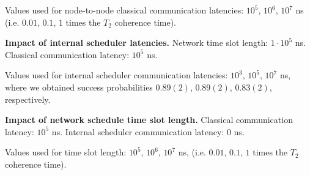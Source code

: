 Values used for node-to-node classical communication latencies: $10^5$, $10^6$, $10^7$ ns (i.e. $0.01$, $0.1$, $1$ times the $T_2$ coherence time).

\textbf{Impact of internal scheduler latencies.}
Network time slot length: $1\cdot 10^5$ ns.
Classical communication latency: $10^5$ ns.

Values used for internal scheduler communication latencies: $10^3$, $10^5$, $10^7$ ns, where we obtained success probabilities $0.89(2)$, $0.89(2)$, $0.83(2)$, respectively.

\textbf{Impact of network schedule time slot length.}
Classical communication latency: $10^5$ ns.
Internal scheduler communication latency: $0$ ns.

Values used for time slot length: $10^5$, $10^6$, $10^7$ ns, (i.e. $0.01$, $0.1$, $1$ times the $T_2$ coherence time).
